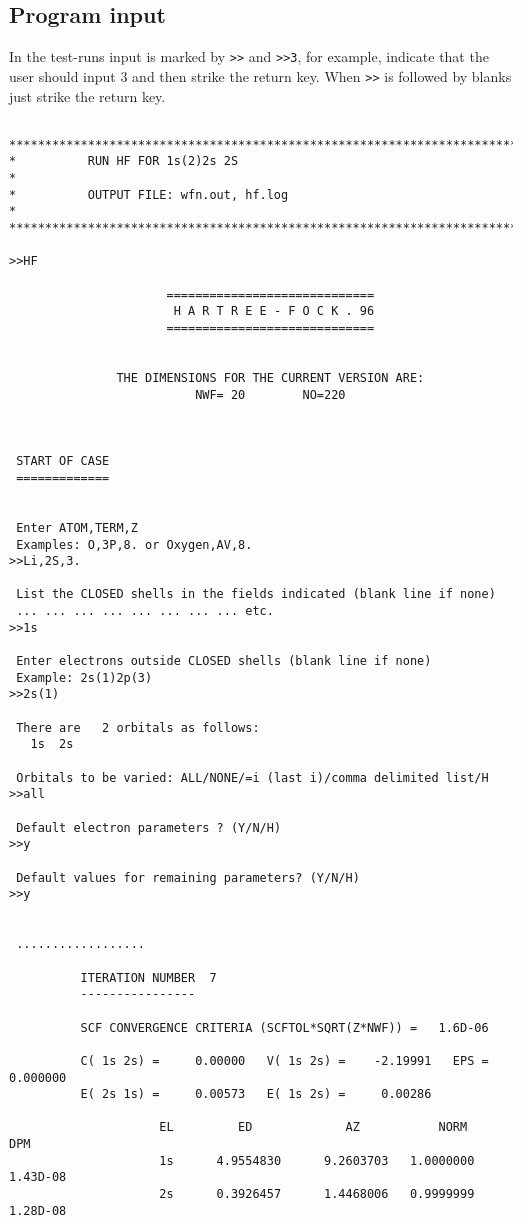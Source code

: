\documentclass[fleqn,10pt]{book}
\begin{document}
\subsection*{Program input}
In the test-runs input is marked by \verb+>>+ and \verb+>>3+, for example, indicate that the user should input 3 and then strike the return key.
When \verb+>>+ is followed by blanks just strike the return key.
\begin{verbatim}

*******************************************************************************
*          RUN HF FOR 1s(2)2s 2S                                              *
*          OUTPUT FILE: wfn.out, hf.log                                       *
*******************************************************************************

>>HF

                      =============================
                       H A R T R E E - F O C K . 96
                      =============================


               THE DIMENSIONS FOR THE CURRENT VERSION ARE:
                          NWF= 20        NO=220



 START OF CASE
 =============


 Enter ATOM,TERM,Z
 Examples: O,3P,8. or Oxygen,AV,8.
>>Li,2S,3.

 List the CLOSED shells in the fields indicated (blank line if none)
 ... ... ... ... ... ... ... ... etc.
>>1s

 Enter electrons outside CLOSED shells (blank line if none)
 Example: 2s(1)2p(3)
>>2s(1)

 There are   2 orbitals as follows:
   1s  2s

 Orbitals to be varied: ALL/NONE/=i (last i)/comma delimited list/H
>>all

 Default electron parameters ? (Y/N/H)
>>y

 Default values for remaining parameters? (Y/N/H)
>>y
 
 
 ..................
 
          ITERATION NUMBER  7
          ----------------

          SCF CONVERGENCE CRITERIA (SCFTOL*SQRT(Z*NWF)) =   1.6D-06

          C( 1s 2s) =     0.00000   V( 1s 2s) =    -2.19991   EPS = 0.000000
          E( 2s 1s) =     0.00573   E( 1s 2s) =     0.00286

                     EL         ED             AZ           NORM       DPM
                     1s      4.9554830      9.2603703   1.0000000    1.43D-08
                     2s      0.3926457      1.4468006   0.9999999    1.28D-08



\end{verbatim}
\end{document}
